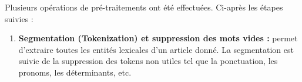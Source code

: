              Plusieurs opérations de pré-traitements ont été effectuées. Ci-après les étapes suivies :
            \begin{enumerate}
                \item{\textbf{Segmentation (Tokenization) et suppression des mots vides :} }permet d'extraire toutes les entités lexicales d'un article donné. La segmentation est suivie de la suppression des tokens non utiles tel que la ponctuation, les pronoms, les déterminants, etc.\\ 
                          
                
                                       
                                                          
                
                                                               
                
                
                
                
                
                
                
                
               

\end{enumerate}
